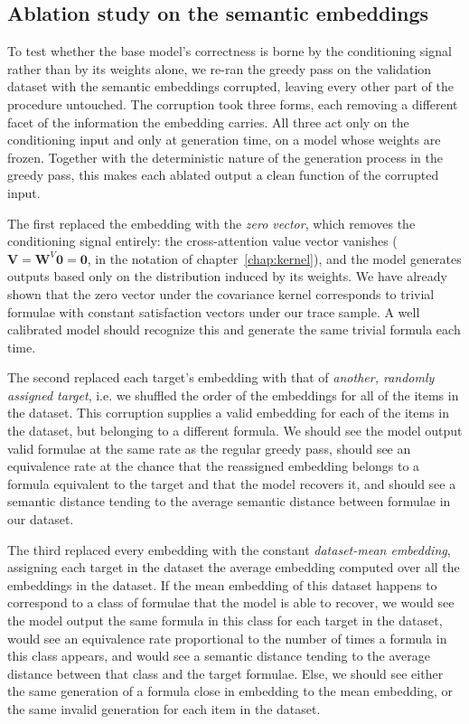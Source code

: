 \documentclass[titlepage,a4paper,11pt]{report}
\begin{document}
    
    \subsection{Ablation study on the semantic embeddings}\label{sec:exp1_ablation}
    To test whether the base model's correctness is borne by the conditioning signal rather than by its weights alone, we re-ran the greedy pass on the validation dataset with the semantic embeddings corrupted, leaving every other part of the procedure untouched. The corruption took three forms, each removing a different facet of the information the embedding carries. All three act only on the conditioning input and only at generation time, on a model whose weights are frozen. Together with the deterministic nature of the generation process in the greedy pass, this makes each ablated output a clean function of the corrupted input.
    
    The first replaced the embedding with the \emph{zero vector}, which removes the conditioning signal entirely: the cross-attention value vector vanishes ($\bm V = \bm W^V \bm 0 = \bm 0$, in the notation of chapter~\ref{chap:kernel}), and the model generates outputs based only on the distribution induced by its weights. We have already shown that the zero vector under the covariance kernel corresponds to trivial formulae with constant satisfaction vectors under our trace sample. A well calibrated model should recognize this and generate the same trivial formula each time.
    
    The second replaced each target's embedding with that of \emph{another, randomly assigned target}, i.e. we shuffled the order of the embeddings for all of the items in the dataset. This corruption supplies a valid embedding for each of the items in the dataset, but belonging to a different formula. We should see the model output valid formulae at the same rate as the regular greedy pass, should see an equivalence rate at the chance that the reassigned embedding belongs to a formula equivalent to the target and that the model recovers it, and should see a semantic distance tending to the average semantic distance between formulae in our dataset. 
    
    The third replaced every embedding with the constant \emph{dataset-mean embedding}, assigning each target in the dataset the average embedding computed over all the embeddings in the dataset. If the mean embedding of this dataset happens to correspond to a class of formulae that the model is able to recover, we would see the model output the same formula in this class for each target in the dataset, would see an equivalence rate proportional to the number of times a formula in this class appears, and would see a semantic distance tending to the average distance between that class and the target formulae. Else, we should see either the same generation of a formula close in embedding to the mean embedding, or the same invalid generation for each item in the dataset.
\end{document}
